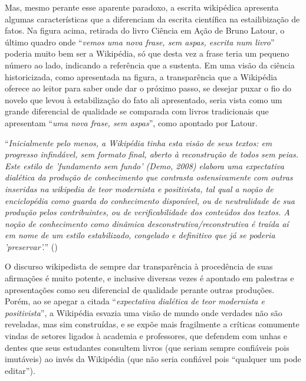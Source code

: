 Mas, mesmo perante esse aparente paradoxo, a escrita wikipédica apresenta algumas características que a diferenciam da escrita científica na estailibização de fatos. Na figura acima, retirada do livro Ciência em Ação de Bruno Latour, o último quadro onde ``\textit{vemos uma nova frase, sem aspas, escrita num livro}'' \citep[p.23]{latour_ciencia_1987} poderia muito bem ser a Wikipédia, só que desta vez a frase teria um pequeno número ao lado, indicando a referência que a sustenta. Em uma visão da ciência historicizada, como apresentada na figura, a transparência que a Wikipédia oferece ao leitor para saber onde dar o próximo passo, se desejar puxar o fio do novelo que levou à estabilização do fato ali apresentado, seria vista como um grande diferencial de qualidade se comparada com livros tradicionais que apresentam ``\textit{uma nova frase, sem aspas}'', como apontado por Latour.

``\textit{Inicialmente pelo menos, a Wikipédia tinha esta visão de seus textos: em progresso infindável, sem formato final, aberto à reconstrução de todos sem peias. Este estilo de 'fundamento sem fundo' (Demo, 2008) elabora uma expectativa dialética da produção de conhecimento que contrasta ostensivamente com outras inseridas na wikipedia de teor modernista e positivista, tal qual a noção de enciclopédia como guarda do conhecimento disponível, ou de neutralidade de sua produção pelos contribuintes, ou de verificabilidade dos conteúdos dos textos. A noção de conhecimento como dinâmica desconstrutiva/reconstrutiva é traída aí em nome de um estilo estabilizado, congelado e definitivo que já se poderia 'preservar'.}'' (\citeyear{demo_conhecimento_2009})

O discurso wikipedista de sempre dar transparência à procedência de suas afirmações é muito potente, e inclusive diversas vezes é apontado em palestras e apresentações como seu diferencial de qualidade perante outras produções. Porém, ao se apegar a citada ``\textit{expectativa dialética de teor modernista e positivista}'', a Wikipédia esvazia uma visão de mundo onde verdades não são reveladas, mas sim construídas, e se expõe mais fragilmente a críticas comumente vindas de setores ligados à academia e professores, que defendem com unhas e dentes que seus estudantes consultem livros (que seriam sempre confiáveis pois imutáveis) ao invés da Wikipédia (que não seria confiável pois ``qualquer um pode editar'').

